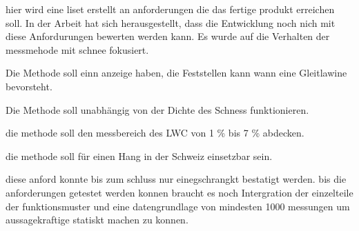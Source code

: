hier wird eine liset erstellt an anforderungen die das fertige produkt erreichen soll. In der Arbeit hat sich herausgestellt, dass die Entwicklung noch nich mit diese Anfordurungen bewerten werden kann. Es wurde auf die Verhalten der messmehode mit schnee fokusiert.

Die Methode soll einn anzeige haben, die Feststellen kann wann eine Gleitlawine bevorsteht.

Die Methode soll unabhängig von der Dichte des Schness funktionieren.

die methode soll den messbereich des LWC von 1 \% bis 7 \% abdecken.

die methode soll für einen Hang in der Schweiz einsetzbar sein.

diese anford konnte bis zum schluss nur einegschrangkt bestatigt werden. bis die anforderungen getestet werden konnen braucht es noch Intergration der einzelteile der funktionsmuster und eine datengrundlage von mindesten 1000 messungen um aussagekraftige statiskt machen zu konnen.
